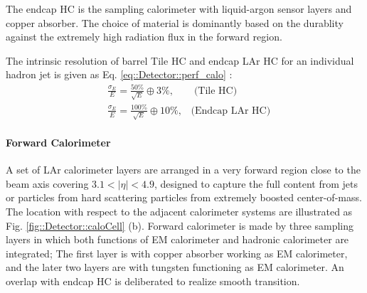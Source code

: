 The endcap HC is the sampling calorimeter with liquid-argon sensor layers and copper absorber. 
The choice of material is dominantly based on the durablity against the extremely high radiation flux in the forward region.


The intrinsic resolution of barrel Tile HC and endcap LAr HC for an individual hadron jet is given as Eq. \ref{eq::Detector::perf_calo} \cite{ATLAS_Tile_TDR}: \\
\begin{align}
& \frac{\sigma_E}{E} = \frac{50\%}{\sqrt{E}} \oplus 3\%, \,\,\,\,\,\,\,\,\,\,\,\,  \mbox{(Tile HC)} \\
& \frac{\sigma_E}{E} = \frac{100\%}{\sqrt{E}} \oplus 10\%,  \,\,\,\,\, \mbox{(Endcap LAr HC)}
\label{eq::Detector::perf_calo}
\end{align}


\paragraph{Forward Calorimeter}
A set of LAr calorimeter layers are arranged in a very forward region close to the beam axis covering $3.1<|\eta|<4.9$, 
designed to capture the full content from jets or particles from hard scattering particles from extremely boosted center-of-mass. The location with respect to the adjacent calorimeter systems are illustrated as Fig. \ref{fig::Detector::caloCell} (b).
Forward calorimeter is made by three sampling layers in which both functions of EM calorimeter and hadronic calorimeter are integrated; The first layer is with copper absorber working as EM calorimeter, and the later two layers are with tungsten functioning as EM calorimeter. An overlap with endcap HC is deliberated to realize smooth transition.

